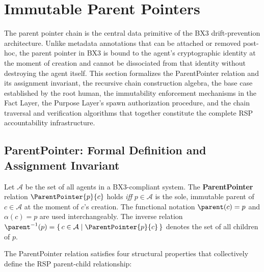 
\section{Immutable Parent Pointers}
\label{sec:immutable_parent_pointers}

The parent pointer chain is the central data primitive of the BX3 drift-prevention architecture. Unlike metadata annotations that can be attached or removed post-hoc, the parent pointer in BX3 is bound to the agent's cryptographic identity at the moment of creation and cannot be dissociated from that identity without destroying the agent itself. This section formalizes the ParentPointer relation and its assignment invariant, the recursive chain construction algebra, the base case established by the root human, the immutability enforcement mechanisms in the Fact Layer, the Purpose Layer's spawn authorization procedure, and the chain traversal and verification algorithms that together constitute the complete RSP accountability infrastructure.

\subsection{ParentPointer: Formal Definition and Assignment Invariant}
\label{sec:pp_definition}

\begin{definition}[ParentPointer]
\label{def:parent_pointer}
Let $\mathcal{A}$ be the set of all agents in a BX3-compliant system. The \textbf{ParentPointer} relation $\ParentPointer{p}{c}$ holds \emph{iff} $p \in \mathcal{A}$ is the sole, immutable parent of $c \in \mathcal{A}$ at the moment of $c$'s creation. The functional notation $\parent(c) = p$ and $\alpha(c) = p$ are used interchangeably. The inverse relation $\parent^{-1}(p) = \{\,c \in \mathcal{A} \mid \ParentPointer{p}{c}\, \}$ denotes the set of all children of $p$.
\end{definition}

The ParentPointer relation satisfies four structural properties that collectively define the RSP parent-child relationship:

